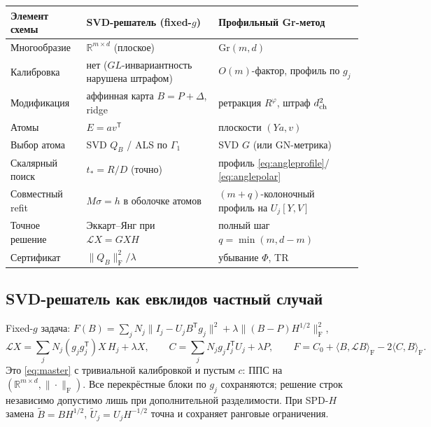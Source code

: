 \documentclass[11pt,a4paper]{article}
\newcommand{\R}{\mathbb R}
\newcommand{\T}{^{\mathsf T}}
\newcommand{\F}{_{\mathrm F}}
\newcommand{\ip}[2]{\langle #1,#2\rangle_{\mathrm F}}
\newcommand{\Gr}{\mathrm{Gr}}
\theoremstyle{remark}
\begin{document}
\begin{center}\small
\begin{tabularx}{\linewidth}{@{}p{30mm}LL@{}}
\toprule
Элемент схемы & SVD-решатель (fixed-$g$) & Профильный Gr-метод\\
\midrule
Многообразие & $\R^{m\times d}$ (плоское) & $\Gr(m,d)$\\
Калибровка & нет ($GL$-инвариантность нарушена штрафом) & $O(m)$-фактор,
профиль по $g_j$\\
Модификация & аффинная карта $B=P+\Delta$, ridge & ретракция $R^\varphi$,
штраф $d_{\rm ch}^2$\\
Атомы & $E=av\T$ & плоскости $(Ya,v)$\\
Выбор атома & SVD $Q_B$ / ALS по $\Gamma_1$ & SVD $G$ (или GN-метрика)\\
Скалярный поиск & $t_*=R/D$ (точно) & профиль \eqref{eq:angleprofile}/%
\eqref{eq:anglepolar}\\
Совместный refit & $M\sigma=h$ в оболочке атомов & $(m+q)$-колоночный
профиль на $U_j[Y,V]$\\
Точное решение & Эккарт--Янг при $\mathcal LX=GXH$ & полный шаг
 $q=\min(m,d-m)$\\
Сертификат & $\|Q_B\|\F^2/\lambda$ & убывание $\Phi$, TR\\
\bottomrule
\end{tabularx}
\end{center}

\subsection{SVD-решатель как евклидов частный случай}\label{sec:svd}

Fixed-$g$ задача: $F(B)=\sum_jN_j\|I_j-U_jB\T g_j\|^2+\lambda\|(B-P)H^{1/2}\|\F^2$,
\begin{equation}\label{eq:Lop}
 \mathcal LX=\sum_jN_j(g_jg_j\T)X\,H_j+\lambda X,\qquad
 C=\sum_jN_jg_jI_j\T U_j+\lambda P,\qquad
 F=C_0+\ip{B}{\mathcal LB}-2\ip{C}{B}.
\end{equation}
Это \eqref{eq:master} с тривиальной калибровкой и пустым $c$: ППС на
 $(\R^{m\times d},\|\cdot\|\F)$. Все перекрёстные блоки по $g_j$ сохраняются; решение строк независимо допустимо лишь при дополнительной
разделимости. При SPD-$H$ замена
 $\widetilde B=BH^{1/2}$, $\widetilde U_j=U_jH^{-1/2}$ точна и сохраняет
ранговые ограничения.
\end{document}
